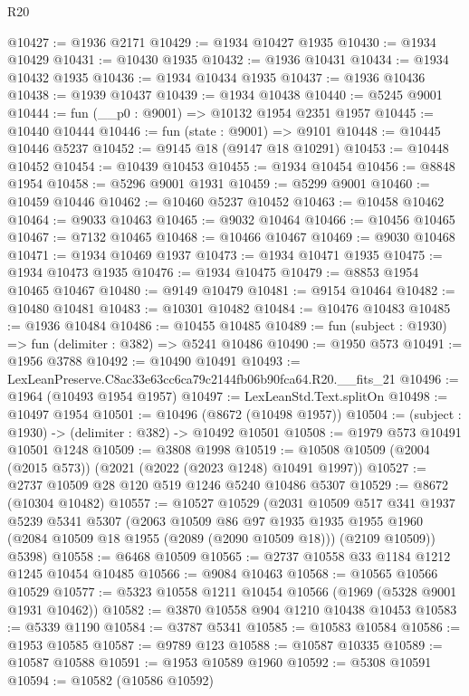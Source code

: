 \begin{lexlean}{R20}
\begin{coremodule}
@10427 := @1936 @2171
@10429 := @1934 @10427 @1935
@10430 := @1934 @10429
@10431 := @10430 @1935
@10432 := @1936 @10431
@10434 := @1934 @10432 @1935
@10436 := @1934 @10434 @1935
@10437 := @1936 @10436
@10438 := @1939 @10437
@10439 := @1934 @10438
@10440 := @5245 @9001
@10444 := fun (__p0 : @9001) => @10132 @1954 @2351 @1957
@10445 := @10440 @10444
@10446 := fun (state : @9001) => @9101
@10448 := @10445 @10446 @5237
@10452 := @9145 @18 (@9147 @18 @10291)
@10453 := @10448 @10452
@10454 := @10439 @10453
@10455 := @1934 @10454
@10456 := @8848 @1954
@10458 := @5296 @9001 @1931
@10459 := @5299 @9001
@10460 := @10459 @10446
@10462 := @10460 @5237 @10452
@10463 := @10458 @10462
@10464 := @9033 @10463
@10465 := @9032 @10464
@10466 := @10456 @10465
@10467 := @7132 @10465
@10468 := @10466 @10467
@10469 := @9030 @10468
@10471 := @1934 @10469 @1937
@10473 := @1934 @10471 @1935
@10475 := @1934 @10473 @1935
@10476 := @1934 @10475
@10479 := @8853 @1954 @10465 @10467
@10480 := @9149 @10479
@10481 := @9154 @10464
@10482 := @10480 @10481
@10483 := @10301 @10482
@10484 := @10476 @10483
@10485 := @1936 @10484
@10486 := @10455 @10485
@10489 := fun (subject : @1930) => fun (delimiter : @382) => @5241 @10486
@10490 := @1950 @573
@10491 := @1956 @3788
@10492 := @10490 @10491
@10493 := LexLeanPreserve.C8ac33e63cc6ca79c2144fb06b90fca64.R20.__fits_21
@10496 := @1964 (@10493 @1954 @1957)
@10497 := LexLeanStd.Text.splitOn
@10498 := @10497 @1954
@10501 := @10496 (@8672 (@10498 @1957))
@10504 := (subject : @1930) -> (delimiter : @382) -> @10492 @10501
@10508 := @1979 @573 @10491 @10501 @1248
@10509 := @3808 @1998
@10519 := @10508 @10509 (@2004 (@2015 @573)) (@2021 (@2022 (@2023 @1248) @10491 @1997))
@10527 := @2737 @10509 @28 @120 @519 @1246 @5240 @10486 @5307
@10529 := @8672 (@10304 @10482)
@10557 := @10527
    @10529
    (@2031
      @10509
      @517
      @341
      @1937
      @5239
      @5341
      @5307
      (@2063
        @10509
        @86
        @97
        @1935
        @1935
        @1955
        @1960
        (@2084 @10509 @18 @1955 (@2089 (@2090 @10509 @18)))
        (@2109 @10509))
      @5398)
@10558 := @6468 @10509
@10565 := @2737 @10558 @33 @1184 @1212 @1245 @10454 @10485
@10566 := @9084 @10463
@10568 := @10565 @10566 @10529
@10577 := @5323 @10558 @1211 @10454 @10566 (@1969 (@5328 @9001 @1931 @10462))
@10582 := @3870 @10558 @904 @1210 @10438 @10453
@10583 := @5339 @1190
@10584 := @3787 @5341
@10585 := @10583 @10584
@10586 := @1953 @10585
@10587 := @9789 @123
@10588 := @10587 @10335
@10589 := @10587 @10588
@10591 := @1953 @10589 @1960
@10592 := @5308 @10591
@10594 := @10582 (@10586 @10592)

\end{coremodule}
\end{lexlean}
